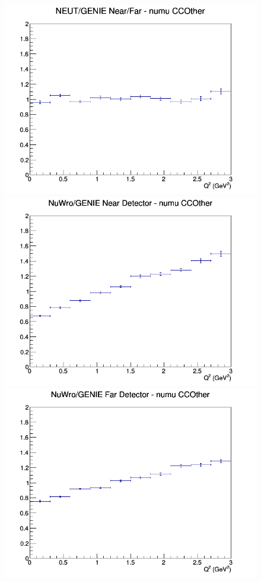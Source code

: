 \documentclass[12pt]{article}
\begin{document}
\begin{figure}[h]
\endminipage
{}
\includegraphics[width=\linewidth]{Q2/nominal/ratios/CCOther_NEUT_GENIE_numu_NF_Q2.png}
\endminipage
\newline
{}
\includegraphics[width=\linewidth]{Q2/nominal/ratios/CCOther_NuWro_GENIE_numu_near_Q2.png}
\endminipage
{}
\includegraphics[width=\linewidth]{Q2/nominal/ratios/CCOther_NuWro_GENIE_numu_far_Q2.png}

\end{figure}
\end{document}
